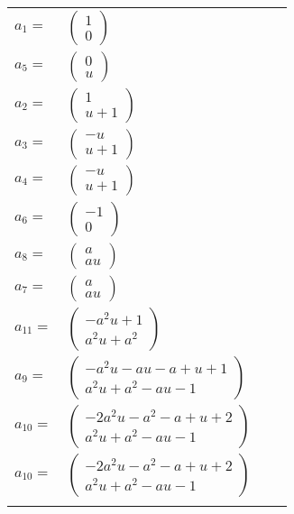 \documentclass[1p]{elsarticle_modified}
\theoremstyle{definition}
\begin{document}
\begin{tabular}{m{7pt} m{180pt} m{7pt} m{180pt} }
\flushright $a_{1}=$&$\begin{pmatrix}1\\0\end{pmatrix}$ \\
\flushright $a_{5}=$&$\begin{pmatrix}0\\u\end{pmatrix}$ \\
\flushright $a_{2}=$&$\begin{pmatrix}1\\u+1\end{pmatrix}$ \\
\flushright $a_{3}=$&$\begin{pmatrix}- u\\u+1\end{pmatrix}$ \\
\flushright $a_{4}=$&$\begin{pmatrix}- u\\u+1\end{pmatrix}$ \\
\flushright $a_{6}=$&$\begin{pmatrix}-1\\0\end{pmatrix}$ \\
\flushright $a_{8}=$&$\begin{pmatrix}a\\a u\end{pmatrix}$ \\
\flushright $a_{7}=$&$\begin{pmatrix}a\\a u\end{pmatrix}$ \\
\flushright $a_{11}=$&$\begin{pmatrix}- a^2 u+1\\a^2 u+a^2\end{pmatrix}$ \\
\flushright $a_{9}=$&$\begin{pmatrix}- a^2 u- a u- a+u+1\\a^2 u+a^2- a u-1\end{pmatrix}$ \\
\flushright $a_{10}=$&$\begin{pmatrix}-2 a^2 u- a^2- a+u+2\\a^2 u+a^2- a u-1\end{pmatrix}$\\ \flushright $a_{10}=$&$\begin{pmatrix}-2 a^2 u- a^2- a+u+2\\a^2 u+a^2- a u-1\end{pmatrix}$\\&\end{tabular}
\end{document}
